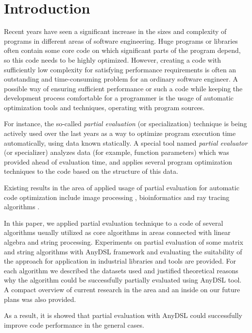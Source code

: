 \documentclass[conference]{IEEEtran}
\begin{document}
\section{Introduction}
Recent years have seen a significant increase in the sizes and complexity of programs in different areas of software engineering. Huge programs or libraries often contain some core code on which significant parts of the program depend, so this code needs to be highly optimized. However, creating a code with sufficiently low complexity for satisfying performance requirements is often an outstanding and time-consuming problem for an ordinary software engineer. A possible way of ensuring sufficient performance or such a code while keeping the development process comfortable for a programmer is the usage of automatic optimization tools and techniques, operating with program sources.

For instance, the so-called \textit{partial evaluation} (or specialization) \cite{jones1993partial} technique is being actively used over the last years as a way to optimize program execution time automatically, using data known statically. A special tool named \textit{partial evaluator} (or specializer) analyzes data (for example, function parameters) which was provided ahead of evaluation time, and applies several program optimization techniques to the code based on the structure of this data. 


Existing results in the area of applied usage of partial evaluation for automatic code optimization include image processing \cite{leissa2018anydsl}, bioinformatics \cite{muller2020anyseq} and ray tracing algorithms \cite{perard2019rodent}.


In this paper, we applied partial evaluation technique to a code of several algorithms usually utilized as core algorithms in areas connected with linear algebra and string processing. Experiments on partial evaluation of some matrix and string algorithms with AnyDSL \cite{leissa2018anydsl} framework and evaluating the suitability of the approach for application in industrial libraries and tools are provided. For each algorithm we described the datasets used and justified theoretical reasons why the algorithm could be successfully partially evaluated using AnyDSL tool. A compact overview of current research in the area and an inside on our future plans was also provided.

As a result, it is showed that partial evaluation with AnyDSL could successfully improve code performance in the general cases.
\end{document}
